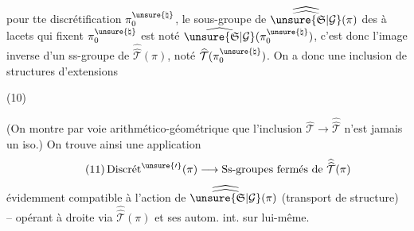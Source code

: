  pour tte discrétification $\pi_0^{\unsure{\natural}}$, le sous-groupe de
$\widehat{\widehat{\unsure{\mathfrak{S}|\mathcal{G}}}}(\pi)$ des  à lacets qui fixent
$\pi_0^{\unsure{\natural}}$ est noté $\widehat{\unsure{\mathfrak{S}|\mathcal{G}}}(\pi_0^{\unsure{\natural}})$,
c'est donc l'image inverse d'un ss-groupe de
$\widehat{\widehat{\mathcal{T}}}(\pi)$, noté
$\widehat{\mathcal{T}}(\pi_0^{\unsure{\natural}})$. On a donc une inclusion de
structures d'extensions

(10)



(On montre par voie arithmético-géométrique que l'inclusion
$\widehat{\mathcal{T}}\longrightarrow\widehat{\widehat{\mathcal{T}}}$
n'est jamais un iso.) On trouve ainsi une application
\[
\tag{11}
\operatorname{Discr\acute{e}t}^{\unsure{\prime}}(\pi)\longrightarrow
\text{Ss-groupes fermés de }\widehat{\widehat{\mathcal{T}}}(\pi)
\]
évidemment compatible à l'action de
$\widehat{\widehat{\unsure{\mathfrak{S}|\mathcal{G}}}}(\pi)$ (transport de structure) -- opérant
à droite via $\widehat{\widehat{\mathcal{T}}}(\pi)$ et ses autom. int. sur lui-même.

